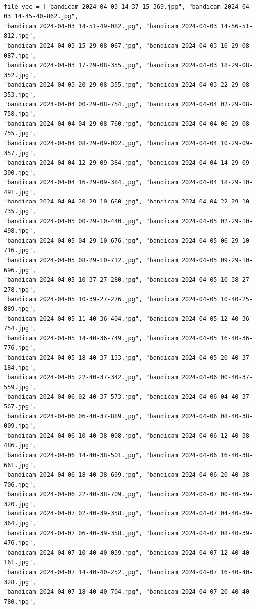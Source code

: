 \documentclass[11pt]{article}
\begin{document}
\begin{verbatim}

file_vec = ["bandicam 2024-04-03 14-37-15-369.jpg", "bandicam 2024-04-03 14-45-40-862.jpg",
"bandicam 2024-04-03 14-51-49-082.jpg", "bandicam 2024-04-03 14-56-51-812.jpg",
"bandicam 2024-04-03 15-29-08-067.jpg", "bandicam 2024-04-03 16-29-08-087.jpg",
"bandicam 2024-04-03 17-29-08-355.jpg", "bandicam 2024-04-03 18-29-08-352.jpg",
"bandicam 2024-04-03 20-29-08-355.jpg", "bandicam 2024-04-03 22-29-08-353.jpg",
"bandicam 2024-04-04 00-29-08-754.jpg", "bandicam 2024-04-04 02-29-08-758.jpg",
"bandicam 2024-04-04 04-29-08-760.jpg", "bandicam 2024-04-04 06-29-08-755.jpg",
"bandicam 2024-04-04 08-29-09-002.jpg", "bandicam 2024-04-04 10-29-09-357.jpg",
"bandicam 2024-04-04 12-29-09-384.jpg", "bandicam 2024-04-04 14-29-09-390.jpg",
"bandicam 2024-04-04 16-29-09-384.jpg", "bandicam 2024-04-04 18-29-10-491.jpg",
"bandicam 2024-04-04 20-29-10-660.jpg", "bandicam 2024-04-04 22-29-10-735.jpg",
"bandicam 2024-04-05 00-29-10-440.jpg", "bandicam 2024-04-05 02-29-10-498.jpg",
"bandicam 2024-04-05 04-29-10-676.jpg", "bandicam 2024-04-05 06-29-10-716.jpg",
"bandicam 2024-04-05 08-29-10-712.jpg", "bandicam 2024-04-05 09-29-10-696.jpg",
"bandicam 2024-04-05 10-37-27-280.jpg", "bandicam 2024-04-05 10-38-27-278.jpg",
"bandicam 2024-04-05 10-39-27-276.jpg", "bandicam 2024-04-05 10-40-25-889.jpg",
"bandicam 2024-04-05 11-40-36-404.jpg", "bandicam 2024-04-05 12-40-36-754.jpg",
"bandicam 2024-04-05 14-40-36-749.jpg", "bandicam 2024-04-05 16-40-36-776.jpg",
"bandicam 2024-04-05 18-40-37-133.jpg", "bandicam 2024-04-05 20-40-37-184.jpg",
"bandicam 2024-04-05 22-40-37-342.jpg", "bandicam 2024-04-06 00-40-37-559.jpg",
"bandicam 2024-04-06 02-40-37-573.jpg", "bandicam 2024-04-06 04-40-37-567.jpg",
"bandicam 2024-04-06 06-40-37-889.jpg", "bandicam 2024-04-06 08-40-38-009.jpg",
"bandicam 2024-04-06 10-40-38-008.jpg", "bandicam 2024-04-06 12-40-38-486.jpg",
"bandicam 2024-04-06 14-40-38-501.jpg", "bandicam 2024-04-06 16-40-38-661.jpg",
"bandicam 2024-04-06 18-40-38-699.jpg", "bandicam 2024-04-06 20-40-38-706.jpg",
"bandicam 2024-04-06 22-40-38-709.jpg", "bandicam 2024-04-07 00-40-39-320.jpg",
"bandicam 2024-04-07 02-40-39-358.jpg", "bandicam 2024-04-07 04-40-39-364.jpg",
"bandicam 2024-04-07 06-40-39-358.jpg", "bandicam 2024-04-07 08-40-39-476.jpg",
"bandicam 2024-04-07 10-40-40-039.jpg", "bandicam 2024-04-07 12-40-40-161.jpg",
"bandicam 2024-04-07 14-40-40-252.jpg", "bandicam 2024-04-07 16-40-40-328.jpg",
"bandicam 2024-04-07 18-40-40-704.jpg", "bandicam 2024-04-07 20-40-40-780.jpg",

\end{verbatim}
\end{document}
